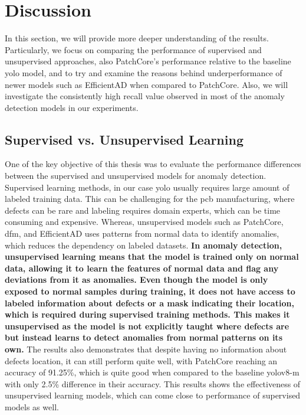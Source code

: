 \chapter{Discussion}

In this section, we will provide more deeper understanding of the results. Particularly, we focus on comparing the performance of supervised and unsupervised approaches, also PatchCore's performance relative to the baseline \gls{yolo} model, and to try and examine the reasons behind underperformance of newer models such as EfficientAD when compared to PatchCore. Also, we will investigate the consistently high recall value observed in most of the anomaly detection models in our experiments.

\section*{Supervised vs. Unsupervised Learning}

One of the key objective of this thesis was to evaluate the performance differences between the supervised and unsupervised models for anomaly detection. Supervised learning methods, in our case \gls{yolo} usually requires large amount of labeled training data. This can be challenging for the \gls{pcb} manufacturing, where defects can be rare and labeling requires domain experts, which can be time consuming and expensive. Whereas, unsupervised models such as PatchCore, \gls{dfm}, and EfficientAD uses patterns from normal data to identify anomalies, which reduces the dependency on labeled datasets. \textbf{In anomaly detection, unsupervised learning means that the model is trained only on normal data, allowing it to learn the features of normal data and flag any deviations from it as anomalies. Even though the model is only exposed to normal samples during training, it does not have access to labeled information about defects or a mask indicating their location, which is required during supervised training methods. This makes it unsupervised as the model is not explicitly taught where defects are but instead learns to detect anomalies from normal patterns on its own.} The results also demonstrates that despite having no information about defects location, it can still perform quite well, with PatchCore reaching an accuracy of 91.25\%, which is quite good when compared to the baseline \gls{yolo}v8-m with only 2.5\% difference in their accuracy. This results shows the effectiveness of unsupervised learning models, which can come close to performance of supervised models as well.

